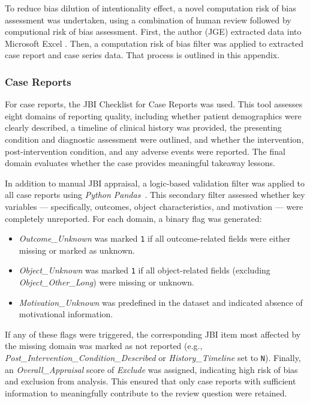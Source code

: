 To reduce bias dilution of intentionality effect, a novel computation risk of bias assessment was undertaken, using a combination of human review followed by computional risk of bias assessment. First, the author (JGE) extracted data into Microsoft Excel \cite{MicrosoftCorporation_2025}. Then, a computation risk of bias filter was applied to extracted case report and case series data. That process is outlined in this appendix.

\subsubsection{Case Reports}
For case reports, the JBI Checklist for Case Reports was used. This tool assesses eight domains of reporting quality, including whether patient demographics were clearly described, a timeline of clinical history was provided, the presenting condition and diagnostic assessment were outlined, and whether the intervention, post-intervention condition, and any adverse events were reported. The final domain evaluates whether the case provides meaningful takeaway lessons.

In addition to manual JBI appraisal, a logic-based validation filter was applied to all case reports using \textit{Python Pandas}~\cite{ThePandasDevelopmentTeam_2020}. This secondary filter assessed whether key variables --- specifically, outcomes, object characteristics, and motivation --- were completely unreported. For each domain, a binary flag was generated:

\begin{itemize}
\item \textit{Outcome\_Unknown} was marked \texttt{1} if all outcome-related fields were either missing or marked as unknown.
\item \textit{Object\_Unknown} was marked \texttt{1} if all object-related fields (excluding \textit{Object\_Other\_Long}) were missing or unknown.
\item \textit{Motivation\_Unknown} was predefined in the dataset and indicated absence of motivational information.
\end{itemize}

If any of these flags were triggered, the corresponding JBI item most affected by the missing domain was marked as not reported (e.g., \textit{Post\_Intervention\_Condition\_Described} or \textit{History\_Timeline} set to \texttt{N}). Finally, an \textit{Overall\_Appraisal} score of \textit{Exclude} was assigned, indicating high risk of bias and exclusion from analysis. This ensured that only case reports with sufficient information to meaningfully contribute to the review question were retained.\\

